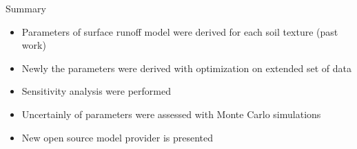 \begin{alertblock}{Summary}
    {\large
    \begin{itemize}
        \item Parameters of surface runoff model were derived for each soil texture (past work)
        \item Newly the parameters were derived with optimization on extended set of data
        \item Sensitivity analysis were performed 
        \item Uncertainly of parameters were assessed with Monte Carlo simulations 
        \item New open source model provider is presented 
    \end{itemize}
    }
\end{alertblock}\vspace{0.9cm}





